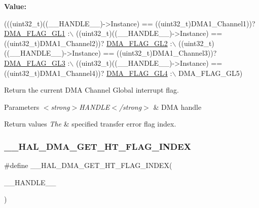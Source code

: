 {\bfseries Value\+:}
\begin{DoxyCode}
(((uint32\_t)((\_\_HANDLE\_\_)->Instance) == ((uint32\_t)DMA1\_Channel1))? \hyperlink{group___d_m_a__flag__definitions_ga56f71da03db3e0a5dfad8cdfe46eac5c}{DMA\_FLAG\_GL1} :\(\backslash\)
 ((uint32\_t)((\_\_HANDLE\_\_)->Instance) == ((uint32\_t)DMA1\_Channel2))? \hyperlink{group___d_m_a__flag__definitions_ga1c8da546d95df14be19e9b82d0a49ecc}{DMA\_FLAG\_GL2} :\(\backslash\)
 ((uint32\_t)((\_\_HANDLE\_\_)->Instance) == ((uint32\_t)DMA1\_Channel3))? \hyperlink{group___d_m_a__flag__definitions_ga245f18e8c146baf3596e7340f7ecae3b}{DMA\_FLAG\_GL3} :\(\backslash\)
 ((uint32\_t)((\_\_HANDLE\_\_)->Instance) == ((uint32\_t)DMA1\_Channel4))? \hyperlink{group___d_m_a__flag__definitions_ga4dc75a03066b5e3700cb650daf4731e2}{DMA\_FLAG\_GL4} :\(\backslash\)
   DMA\_FLAG\_GL5)
\end{DoxyCode}


Return the current D\+MA Channel Global interrupt flag. 


\begin{DoxyParams}{Parameters}
{\em $<$strong$>$\+H\+A\+N\+D\+L\+E$<$/strong$>$} & D\+MA handle \\
\hline
\end{DoxyParams}

\begin{DoxyRetVals}{Return values}
{\em The} & specified transfer error flag index. \\
\hline
\end{DoxyRetVals}
\mbox{\label{group___d_m_a_ex___exported___macros_ga0095f5f3166a82bedc67744ac94acfba}} 
\subsubsection{\texorpdfstring{\+\_\+\+\_\+\+H\+A\+L\+\_\+\+D\+M\+A\+\_\+\+G\+E\+T\+\_\+\+H\+T\+\_\+\+F\+L\+A\+G\+\_\+\+I\+N\+D\+EX}{\_\_HAL\_DMA\_GET\_HT\_FLAG\_INDEX}}
{\footnotesize\ttfamily \#define \+\_\+\+\_\+\+H\+A\+L\+\_\+\+D\+M\+A\+\_\+\+G\+E\+T\+\_\+\+H\+T\+\_\+\+F\+L\+A\+G\+\_\+\+I\+N\+D\+EX(\begin{DoxyParamCaption}\item[{}]{\+\_\+\+\_\+\+H\+A\+N\+D\+L\+E\+\_\+\+\_\+ }\end{DoxyParamCaption})}

